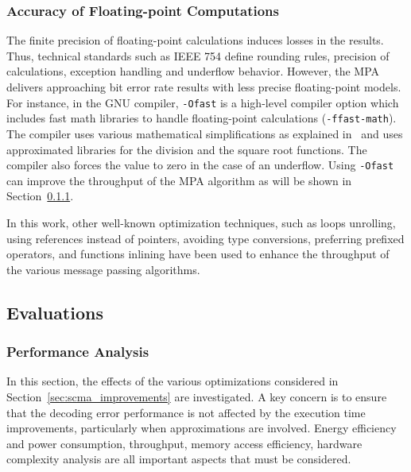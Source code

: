 \subsubsection{Accuracy of Floating-point Computations}
\label{sec:scma_improvements_float}

The finite precision of floating-point calculations induces losses in the
results. Thus, technical standards such as IEEE 754 define rounding rules,
precision of calculations, exception handling and underflow behavior. However,
the MPA delivers approaching bit error rate results with less precise
floating-point models. For instance, in the GNU compiler, \verb|-Ofast| is a
high-level compiler option which includes fast math libraries to handle
floating-point calculations (\verb|-ffast-math|). The compiler uses various
mathematical simplifications as explained in~\cite{Gccfp2018} and uses
approximated libraries for the division and the square root functions. The
compiler also forces the value to zero in the case of an underflow. Using
\verb|-Ofast| can improve the throughput of the MPA algorithm as will be shown
in Section~\ref{sec:scma_performance}.

In this work, other well-known optimization techniques, such as loops unrolling,
using references instead of pointers, avoiding type conversions, preferring
prefixed operators, and functions inlining have been used to enhance the
throughput of the various message passing algorithms.

\subsection{Evaluations}

\subsubsection{Performance Analysis}
\label{sec:scma_performance}

In this section, the effects of the various optimizations considered in
Section~\ref{sec:scma_improvements} are investigated. A key concern is to ensure
that the decoding error performance is not affected by the execution time
improvements, particularly when approximations are involved. Energy efficiency
and power consumption, throughput, memory access efficiency, hardware complexity
analysis are all important aspects that must be considered.

